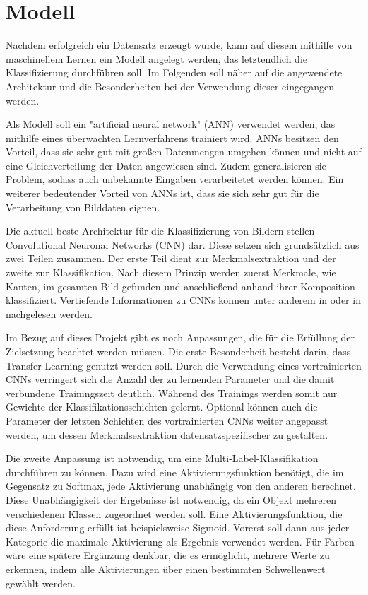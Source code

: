 \section{Modell} \label{sec:model}

Nachdem erfolgreich ein Datensatz erzeugt wurde, kann auf diesem mithilfe von maschinellem Lernen ein Modell angelegt werden, das letztendlich die Klassifizierung durchführen soll. Im Folgenden soll näher auf die angewendete Architektur und die Besonderheiten bei der Verwendung dieser eingegangen werden.

Als Modell soll ein "artificial neural network" (ANN) verwendet werden, das mithilfe eines überwachten Lernverfahrens trainiert wird. ANNs besitzen den Vorteil, dass sie sehr gut mit großen Datenmengen umgehen können und nicht auf eine Gleichverteilung der Daten angewiesen sind. Zudem generalisieren sie Problem, sodass auch unbekannte Eingaben verarbeitetet werden können. Ein weiterer bedeutender Vorteil von ANNs ist, dass sie sich sehr gut für die Verarbeitung von Bilddaten eignen. \cite{Mahanta2020}

Die aktuell beste Architektur für die Klassifizierung von Bildern stellen Convolutional Neuronal Networks (CNN) dar. Diese setzen sich grundsätzlich aus zwei Teilen zusammen. Der erste Teil dient zur Merkmalsextraktion und der zweite zur Klassifikation. Nach diesem Prinzip werden zuerst Merkmale, wie Kanten, im gesamten Bild gefunden und anschließend anhand ihrer Komposition klassifiziert. Vertiefende Informationen zu CNNs können unter anderem in \cite{Goodfellow2016} oder in \cite{CS2020} nachgelesen werden.

Im Bezug auf dieses Projekt gibt es noch Anpassungen, die für die Erfüllung der Zielsetzung beachtet werden müssen. Die erste Besonderheit besteht darin, dass Transfer Learning genutzt werden soll. Durch die Verwendung eines vortrainierten CNNs verringert sich die Anzahl der zu lernenden Parameter und die damit verbundene Trainingszeit deutlich. Während des Trainings werden somit nur Gewichte der Klassifikationsschichten gelernt. Optional können auch die Parameter der letzten Schichten des vortrainierten CNNs weiter angepasst werden, um dessen Merkmalsextraktion datensatzspezifischer zu gestalten.

Die zweite Anpassung ist notwendig, um eine Multi-Label-Klassifikation durchführen zu können. Dazu wird eine Aktivierungsfunktion benötigt, die im Gegensatz zu Softmax, jede Aktivierung unabhängig von den anderen berechnet. Diese Unabhängigkeit der Ergebnisse ist notwendig, da ein Objekt mehreren verschiedenen Klassen zugeordnet werden soll. Eine Aktivierungsfunktion, die diese Anforderung erfüllt ist beispielsweise Sigmoid. Vorerst soll dann aus jeder Kategorie die maximale Aktivierung als Ergebnis verwendet werden. Für Farben wäre eine spätere Ergänzung denkbar, die es ermöglicht, mehrere Werte zu erkennen, indem alle Aktivierungen über einen bestimmten Schwellenwert gewählt werden. 

